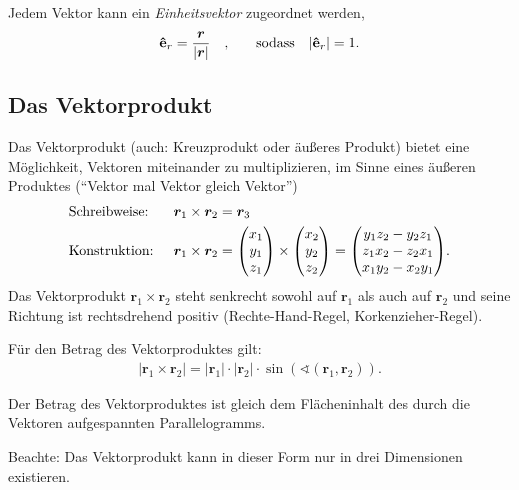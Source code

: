 Jedem Vektor kann ein \emph{Einheitsvektor} zugeordnet werden, 
\begin{align}
    \vu{e}_r = \frac{\bm{r}}{|\bm{r}|} \qq{,} \qq{sodass} |\vu{e}_r| = 1.
\end{align}

\subsection{Das Vektorprodukt}

Das Vektorprodukt (auch: Kreuzprodukt oder äußeres Produkt) bietet eine Möglichkeit, Vektoren miteinander zu multiplizieren, im Sinne eines äußeren Produktes (``Vektor mal Vektor gleich Vektor'')
\begin{align}
    &\text{Schreibweise: } & \bm{r}_1 \times \bm{r}_2 &= \bm{r}_3 \notag \\
    &\text{Konstruktion: } & \bm{r}_1 \times \bm{r}_2 &= \mqty(x_1\\y_1\\z_1) \times \mqty(x_2\\y_2\\z_2) = \mqty(y_1 z_2 - y_2 z_1 \\ z_1 x_2 - z_2 x_1 \\ x_1 y_2 - x_2 y_1). 
\end{align}
Das Vektorprodukt $ \bm{r}_1 \times \bm{r}_2$ steht senkrecht sowohl auf $\bm{r}_1$ als auch auf $\bm{r}_2$ und seine Richtung ist rechtsdrehend positiv (Rechte-Hand-Regel, Korkenzieher-Regel).

Für den Betrag des Vektorproduktes gilt:
\begin{align}
    | \bm{r}_1 \times \bm{r}_2| = |\bm{r}_1| \cdot |\bm{r}_2|\cdot \sin(\sphericalangle(\bm{r}_1,\bm{r}_2)).
\end{align}

Der Betrag des Vektorproduktes ist gleich dem Flächeninhalt des durch die Vektoren aufgespannten Parallelogramms. 
\begin{figure}[htp]
    \centering
\end{figure}
Beachte: Das Vektorprodukt kann in dieser Form nur in drei Dimensionen existieren. 

